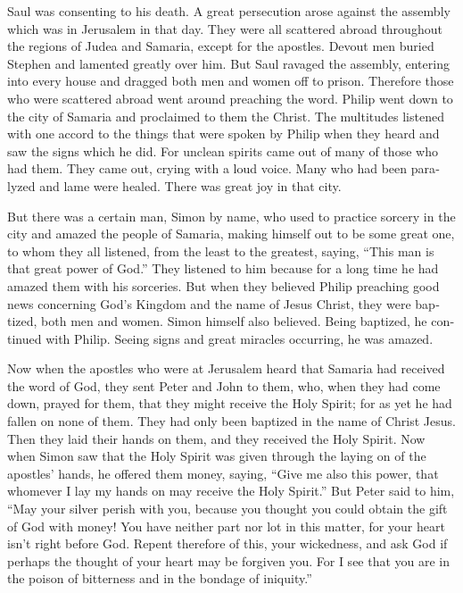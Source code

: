 \begin{paracol}{2}
\begin{otherlanguage}{english}
 Saul was consenting to his death. A great persecution
arose against the assembly which was in Jerusalem in that day. They were
all scattered abroad throughout the regions of Judea and Samaria, except
for the apostles.  Devout men buried Stephen and lamented
greatly over him.  But Saul ravaged the assembly, entering
into every house and dragged both men and women off to prison.
 Therefore those who were scattered abroad went around
preaching the word.  Philip went down to the city of
Samaria and proclaimed to them the Christ.  The multitudes
listened with one accord to the things that were spoken by Philip when
they heard and saw the signs which he did.  For unclean
spirits came out of many of those who had them. They came out, crying
with a loud voice. Many who had been paralyzed and lame were healed.
 There was great joy in that city.

 But there was a certain man, Simon by name, who used to
practice sorcery in the city and amazed the people of Samaria, making
himself out to be some great one,  to whom they all
listened, from the least to the greatest, saying, ``This man is that
great power of God.''  They listened to him because for a
long time he had amazed them with his sorceries.  But
when they believed Philip preaching good news concerning God's Kingdom
and the name of Jesus Christ, they were baptized, both men and women.
 Simon himself also believed. Being baptized, he
continued with Philip. Seeing signs and great miracles occurring, he was
amazed.

 Now when the apostles who were at Jerusalem heard that
Samaria had received the word of God, they sent Peter and John to them,
 who, when they had come down, prayed for them, that they
might receive the Holy Spirit;  for as yet he had fallen
on none of them. They had only been baptized in the name of Christ
Jesus.  Then they laid their hands on them, and they
received the Holy Spirit.  Now when Simon saw that the
Holy Spirit was given through the laying on of the apostles' hands, he
offered them money,  saying, ``Give me also this power,
that whomever I lay my hands on may receive the Holy Spirit.''
 But Peter said to him, ``May your silver perish with
you, because you thought you could obtain the gift of God with money!
 You have neither part nor lot in this matter, for your
heart isn't right before God.  Repent therefore of this,
your wickedness, and ask God if perhaps the thought of your heart may be
forgiven you.  For I see that you are in the poison of
bitterness and in the bondage of iniquity.''


\end{otherlanguage}
\end{paracol}
